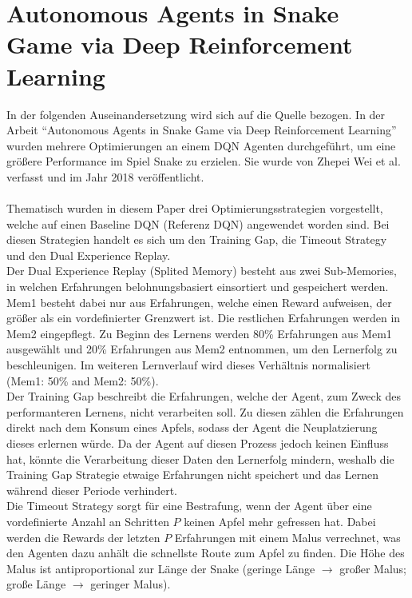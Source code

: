 \section{Autonomous Agents in Snake Game via Deep Reinforcement Learning} \label{sec:Paper_1}
In der folgenden Auseinandersetzung wird sich auf die Quelle \cite{Autonomous_Agents_in_Snake_Game_via_DRL} bezogen.
In der Arbeit "`Autonomous Agents in Snake Game via Deep Reinforcement Learning"' wurden mehrere Optimierungen an einem DQN Agenten durchgeführt, um eine größere Performance im Spiel Snake zu erzielen. Sie wurde von Zhepei Wei et al. verfasst und im Jahr 2018 veröffentlicht.\\
\\Thematisch wurden in diesem Paper drei Optimierungsstrategien vorgestellt, welche auf einen Baseline DQN (Referenz DQN) angewendet worden sind. Bei diesen Strategien handelt es sich um den Training Gap, die Timeout Strategy und den Dual Experience Replay.\\
Der Dual Experience Replay (Splited Memory) besteht aus zwei Sub-Memories, in welchen Erfahrungen belohnungsbasiert einsortiert und gespeichert werden. Mem1 besteht dabei nur aus Erfahrungen, welche einen Reward aufweisen, der größer als ein vordefinierter Grenzwert ist. Die restlichen Erfahrungen werden in Mem2 eingepflegt. 
Zu Beginn des Lernens werden 80\% Erfahrungen aus Mem1 ausgewählt und 20\% Erfahrungen aus Mem2 entnommen, um den Lernerfolg zu beschleunigen. Im weiteren Lernverlauf wird dieses Verhältnis normalisiert (Mem1: 50\% and Mem2: 50\%).\\
Der Training Gap beschreibt die Erfahrungen, welche der Agent, zum Zweck des performanteren Lernens, nicht verarbeiten soll. Zu diesen zählen die Erfahrungen direkt nach dem Konsum eines Apfels, sodass der Agent die Neuplatzierung dieses erlernen würde. 
Da der Agent auf diesen Prozess jedoch keinen Einfluss hat, könnte die Verarbeitung dieser Daten den Lernerfolg mindern, weshalb die Training Gap Strategie etwaige Erfahrungen nicht speichert und das Lernen während dieser Periode verhindert.\\
Die Timeout Strategy sorgt für eine Bestrafung, wenn der Agent über eine vordefinierte Anzahl an Schritten $P$ keinen Apfel mehr gefressen hat. Dabei werden die Rewards der letzten $P$ Erfahrungen mit einem Malus verrechnet, was den Agenten dazu anhält die schnellste Route zum Apfel zu finden. Die Höhe des Malus ist antiproportional zur Länge der Snake (geringe Länge $\rightarrow$ großer Malus; große Länge $\rightarrow$ geringer Malus).\\
